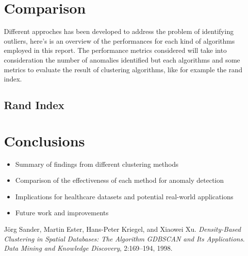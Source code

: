 \documentclass[a4paper]{article}
\begin{document}
\section{Comparison}
Different approches has been developed to address the problem of identifying outliers, here's is an overview of the performances for each kind of algorithms employed in this report. The performance metrics considered will take into consideration the number of anomalies identified but each algorithms and some metrics to evaluate the result of clustering algorithms, like for example the rand index. 

\subsection{Rand Index}

\section{Conclusions}
\begin{itemize}
    \item Summary of findings from different clustering methods
    \item Comparison of the effectiveness of each method for anomaly detection
    \item Implications for healthcare datasets and potential real-world applications
    \item Future work and improvements
\end{itemize}

\begin{thebibliography}{Com79}

J{\"o}rg Sander, Martin Ester, Hans-Peter Kriegel, and Xiaowei Xu.
\newblock \emph{Density-Based Clustering in Spatial Databases: The Algorithm GDBSCAN and Its Applications}.
\newblock \emph{Data Mining and Knowledge Discovery}, 2:169--194, 1998.

\end{thebibliography}
\end{document}
